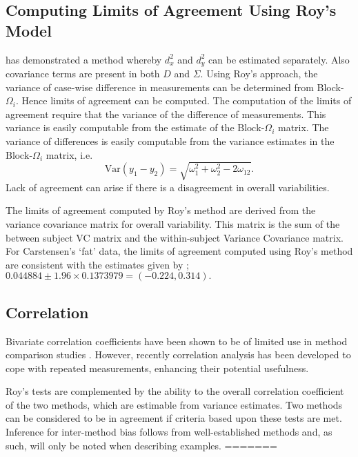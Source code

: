 \documentclass[12pt, a4paper]{report}
\theoremstyle{plain}
\theoremstyle{definition}
\theoremstyle{remark}
\begin{document}
\subsection{Computing Limits of Agreement Using Roy's Model}
	\citet{ARoy2009} has demonstrated a method whereby $d^2_{x}$ and $d^2_{y}$ can be estimated separately. Also covariance terms are present in both ${D}$ and ${\Sigma}$. Using Roy's approach, the variance of case-wise difference in measurements can be determined from Block-${\Omega}_{i}$. Hence limits of agreement can be computed. The computation of the limits of agreement require that the variance of the difference of measurements. This variance is easily computable from the estimate of the ${\mbox{Block-}\Omega_{i}}$ matrix.
	The variance of differences is easily computable from the variance estimates in the ${\mbox{Block-}\Omega_{i}}$ matrix, i.e.
	\[
	\mathrm{Var}(y_1 - y_2) = \sqrt{ \omega^2_1 + \omega^2_2 - 2\omega_{12}}.
	\]
	Lack of agreement can arise if there is a disagreement in overall variabilities. 
	
	The limits of agreement computed by Roy's method are derived from the variance covariance matrix for overall variability.
	This matrix is the sum of the between subject VC matrix and the within-subject Variance Covariance matrix.
	For Carstensen's `fat' data, the limits of agreement computed using Roy's
	method are consistent with the estimates given by \citet{BXC2008}; $0.044884  \pm 1.96 \times  0.1373979 = (-0.224,  0.314).$
	
	
	
	

	


\subsection{Correlation}
Bivariate correlation coefficients have been shown to be of limited use in method comparison studies \citep{BA86}. However, recently correlation analysis has been developed to cope with repeated measurements, enhancing their potential usefulness. 

Roy's tests are complemented by the ability to the overall correlation coefficient of the two methods, which are estimable from variance estimates. Two methods can be considered to be in agreement if criteria based upon these tests are met. Inference for inter-method bias follows from well-established methods and, as such, will only be noted when describing examples.
=======
\end{document}
